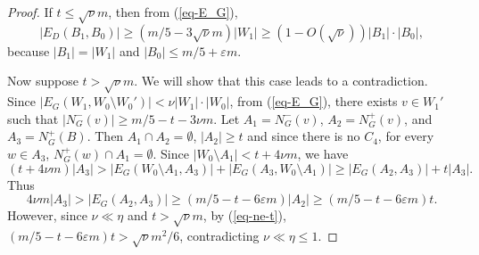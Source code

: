 \documentclass{article}
\renewcommand{\epsilon}{{\varepsilon}}
\begin{document}
\begin{proof}
If $t\leq \sqrt{\nu}m$, then from (\ref{eq-E_G}), 
$$|E_D(B_1, B_0)|\geq (m/5- 3\sqrt{\nu} m)|W_1|\geq (1- O(\sqrt{\nu}))|B_1|\cdot |B_0|,$$
because $|B_1|=|W_1|$ and $|B_0|\leq m/5+\epsilon m$.

Now suppose $t>\sqrt{\nu}m$. We will show that this case leads to a contradiction. Since $|E_G(W_1, W_0\setminus W_0')|<\nu |W_1|\cdot |W_0|$, from (\ref{eq-E_G}), there exists $v\in W_1'$ such that $|N_G^-(v)|\geq m/5 -t -3\nu m$. Let $A_1= N^-_G(v)$, $A_2=N^+_G(v)$, and $A_3=N^+_G(B)$. Then $A_1\cap A_2=\emptyset$, $|A_2|\geq t $ and since there is no $C_4$, for every $w\in A_3$, $N^+_G(w)\cap A_1=\emptyset$. Since $|W_0\setminus A_1|<t+4\nu m$, we have
$$(t+4\nu m)|A_3|> |E_G(W_0\setminus A_1, A_3)|+ |E_G(A_3, W_0\setminus A_1)|\geq |E_G(A_2, A_3)|+t|A_3|.$$
 Thus
 $$4\nu m |A_3|> |E_G(A_2,A_3)|\geq (m/5-t-6\epsilon m)|A_2|\geq (m/5-t-6\epsilon m)t.$$
However, since $\nu \ll \eta$ and $t>\sqrt{\nu}m$, by (\ref{eq-ne-t}),
$(m/5-t-6\epsilon m)t> \sqrt{\nu} m^2/6$, contradicting $\nu \ll \eta \leq 1$.

\end{proof}
\end{document}
